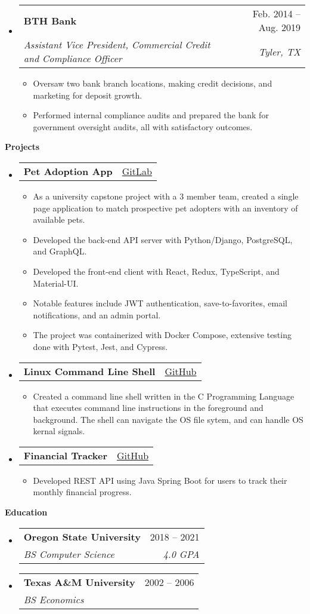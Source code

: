 \documentclass[letterpaper,12pt]{article}[leftmargin=*]
\makeatletter
\def \projectatext {GitLab}
\def \projectalink {https://gitlab.com/marc.clinedinst/osu-cs-467}
\def \projectbtext {GitHub}
\def \projectblink {https://github.com/robertjonesdev/CS344-Small-Linux-Shell}
\def \projectctext {GitHub}
\def \projectclink {https://github.com/robertjonesdev/FinancialTracker-SpringBoot}
\def \entryspacing {-0pt}
\def \projecta {\href{\projectalink}{\projectatext}}
\def \projectb {\href{\projectblink}{\projectbtext}}
\def \projectc {\href{\projectclink}{\projectctext}}
\renewcommand{\section}[2]{\vspace{5pt}
  \colorbox{secondary}{\color{white}\raggedbottom\normalsize\textbf{{#1}{\hspace{7pt}#2}}}
}
\newcommand{\resumeEntryStart}{\begin{itemize}[leftmargin=2.5mm]}
\newcommand{\resumeEntryEnd}{\end{itemize}\vspace{\entryspacing}}
\newcommand{\resumeItemListStart}{\begin{itemize}[leftmargin=4.5mm]}
\newcommand{\resumeItemListEnd}{\end{itemize}}
\newcommand{\resumeItem}[1]{
  \item\small{
    {#1 \vspace{-2pt}}
  }
}
\newcommand{\resumeEntryTSDL}[4]{
  \vspace{-1pt}\item[]
    \begin{tabularx}{0.97\textwidth}{X@{\hspace{60pt}}r}
      \textbf{\color{primary}#1} & {\firabook\color{accent}\small#2} \\
      \textit{\color{accent}\small#3} & \textit{\color{accent}\small#4} \\
    \end{tabularx}\vspace{-6pt}
}
\newcommand{\resumeEntryTD}[2]{
  \vspace{-1pt}\item[]
    \begin{tabularx}{0.97\textwidth}{X@{\hspace{60pt}}r}
      \textbf{\color{primary}#1} & {\firabook\color{accent}\small#2} \\
    \end{tabularx}\vspace{-6pt}
}
\makeatother
\begin{document}
  \resumeEntryStart
    \resumeEntryTSDL
      {BTH Bank}{Feb. 2014 -- Aug. 2019}
      {Assistant Vice President, Commercial Credit and Compliance Officer}{Tyler, TX}
    \resumeItemListStart
        \resumeItem {Oversaw two bank branch locations, making credit decisions, and marketing for deposit growth.}
        \resumeItem {Performed internal compliance audits and prepared the bank for government oversight audits, all with satisfactory outcomes.}
    \resumeItemListEnd
  \resumeEntryEnd

\section{\faFlask}{Projects}

  \resumeEntryStart
    \resumeEntryTD
      {Pet Adoption App}{\projecta}
    \resumeItemListStart
      \resumeItem {As a university capstone project with a 3 member team, created a single page application to match prospective pet adopters with an inventory of available pets.}
      \resumeItem {Developed the back-end API server with Python/Django, PostgreSQL, and GraphQL.}
      \resumeItem {Developed the front-end client with React, Redux, TypeScript, and Material-UI.}
      \resumeItem {Notable features include JWT authentication, save-to-favorites, email notifications, and an admin portal.}
      \resumeItem {The project was containerized with Docker Compose, extensive testing done with Pytest, Jest, and Cypress.}
    \resumeItemListEnd
  \resumeEntryEnd

  \resumeEntryStart
    \resumeEntryTD
      {Linux Command Line Shell}{\projectb}
    \resumeItemListStart
      \resumeItem {Created a command line shell written in the C Programming Language that executes command line instructions in the foreground and background. The shell can navigate the OS file sytem, and can handle OS kernal signals.}
    \resumeItemListEnd
  \resumeEntryEnd

  \resumeEntryStart
    \resumeEntryTD
      {Financial Tracker}{\projectc}
    \resumeItemListStart
      \resumeItem {Developed REST API using Java Spring Boot for users to track their monthly financial progress.}
    \resumeItemListEnd
  \resumeEntryEnd


\section{\faGraduationCap}{Education}

  \resumeEntryStart
    \resumeEntryTSDL
      {Oregon State University}{2018 -- 2021}
      {BS Computer Science}{4.0 GPA}
  \resumeEntryEnd

  \resumeEntryStart
    \resumeEntryTSDL
      {Texas A\&M University}{2002 -- 2006}
      {BS Economics}{ }
  \resumeEntryEnd
\end{document}
